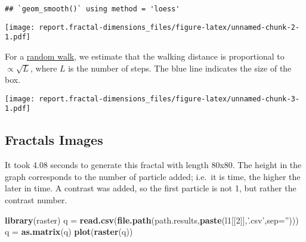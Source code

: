 \documentclass[]{article}
\newenvironment{Shaded}{\begin{snugshade}}{\end{snugshade}}
\newcommand{\DataTypeTok}[1]{\textcolor[rgb]{0.13,0.29,0.53}{#1}}
\newcommand{\DecValTok}[1]{\textcolor[rgb]{0.00,0.00,0.81}{#1}}
\newcommand{\KeywordTok}[1]{\textcolor[rgb]{0.13,0.29,0.53}{\textbf{#1}}}
\newcommand{\NormalTok}[1]{#1}
\newcommand{\OperatorTok}[1]{\textcolor[rgb]{0.81,0.36,0.00}{\textbf{#1}}}
\newcommand{\StringTok}[1]{\textcolor[rgb]{0.31,0.60,0.02}{#1}}
\begin{document}
\begin{verbatim}
## `geom_smooth()` using method = 'loess'
\end{verbatim}

\texttt{[image: report.fractal-dimensions\_files/figure-latex/unnamed-chunk-2-1.pdf]}

For a \href{https://en.wikipedia.org/wiki/Random_walk}{random walk}, we
estimate that the walking distance is proportional to
\(\propto \sqrt{L}\), where \(L\) is the number of steps. The blue line
indicates the size of the box.

\begin{Shaded}
\end{Shaded}

\texttt{[image: report.fractal-dimensions\_files/figure-latex/unnamed-chunk-3-1.pdf]}

\hypertarget{fractals-images}{%
\subsection{Fractals Images}\label{fractals-images}}

It took 4.08 seconds to generate this fractal with length 80x80. The
height in the graph corresponds to the number of particle added; i.e.~it
is time, the higher the later in time. A contrast was added, so the
first particle is not 1, but rather the contrast number.

\begin{Shaded}
\begin{Highlighting}[]
\KeywordTok{library}\NormalTok{(raster)}
\NormalTok{q =}\StringTok{ }\KeywordTok{read.csv}\NormalTok{(}\KeywordTok{file.path}\NormalTok{(path.results,}\KeywordTok{paste}\NormalTok{(l1[[}\DecValTok{2}\NormalTok{]],}\StringTok{'.csv'}\NormalTok{,}\DataTypeTok{sep=}\StringTok{''}\NormalTok{)))}
\NormalTok{q =}\StringTok{ }\KeywordTok{as.matrix}\NormalTok{(q)}
\KeywordTok{plot}\NormalTok{(}\KeywordTok{raster}\NormalTok{(q))}
\end{Highlighting}
\end{Shaded}
\end{document}
